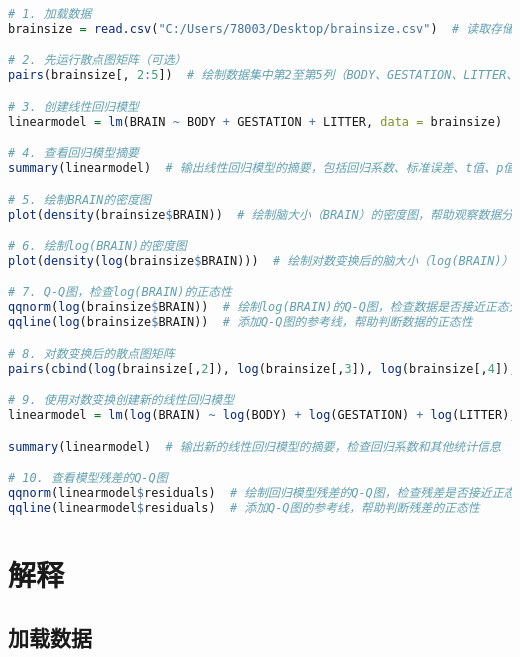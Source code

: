 \documentclass[UTF8]{report}
\theoremstyle{MyLineTheoremStyle} %
\theoremstyle{MyBlockTheoremStyle} %
\theoremstyle{MySubsubsectionStyle} %
\begin{document}
\begin{lstlisting}[language=R]
    # 1. 加载数据
brainsize = read.csv("C:/Users/78003/Desktop/brainsize.csv")  # 读取存储在桌面上的 CSV 文件，包含脑大小（BRAIN）、体重（BODY）、妊娠期（GESTATION）、胎数（LITTER）等数据

# 2. 先运行散点图矩阵（可选）
pairs(brainsize[, 2:5])  # 绘制数据集中第2至第5列（BODY、GESTATION、LITTER、BRAIN）之间的散点图矩阵，帮助检查变量之间的关系

# 3. 创建线性回归模型
linearmodel = lm(BRAIN ~ BODY + GESTATION + LITTER, data = brainsize)  # 创建一个线性回归模型，预测BRAIN（脑大小）基于BODY（体重）、GESTATION（妊娠期）和LITTER（胎数）

# 4. 查看回归模型摘要
summary(linearmodel)  # 输出线性回归模型的摘要，包括回归系数、标准误差、t值、p值等信息

# 5. 绘制BRAIN的密度图
plot(density(brainsize$BRAIN))  # 绘制脑大小（BRAIN）的密度图，帮助观察数据分布的形态

# 6. 绘制log(BRAIN)的密度图
plot(density(log(brainsize$BRAIN)))  # 绘制对数变换后的脑大小（log(BRAIN)）的密度图，检查数据是否服从对数正态分布

# 7. Q-Q图，检查log(BRAIN)的正态性
qqnorm(log(brainsize$BRAIN))  # 绘制log(BRAIN)的Q-Q图，检查数据是否接近正态分布
qqline(log(brainsize$BRAIN))  # 添加Q-Q图的参考线，帮助判断数据的正态性

# 8. 对数变换后的散点图矩阵
pairs(cbind(log(brainsize[,2]), log(brainsize[,3]), log(brainsize[,4]), log(brainsize[,5])))  # 绘制对数变换后的散点图矩阵，检查log变换后的各个变量之间的关系

# 9. 使用对数变换创建新的线性回归模型
linearmodel = lm(log(BRAIN) ~ log(BODY) + log(GESTATION) + log(LITTER), data = brainsize)  # 创建新的线性回归模型，预测对数变换后的BRAIN基于对数变换后的BODY、GESTATION和LITTER

summary(linearmodel)  # 输出新的线性回归模型的摘要，检查回归系数和其他统计信息

# 10. 查看模型残差的Q-Q图
qqnorm(linearmodel$residuals)  # 绘制回归模型残差的Q-Q图，检查残差是否接近正态分布
qqline(linearmodel$residuals)  # 添加Q-Q图的参考线，帮助判断残差的正态性

\end{lstlisting}


\section*{解释}

\subsection*{加载数据}
\end{document}
